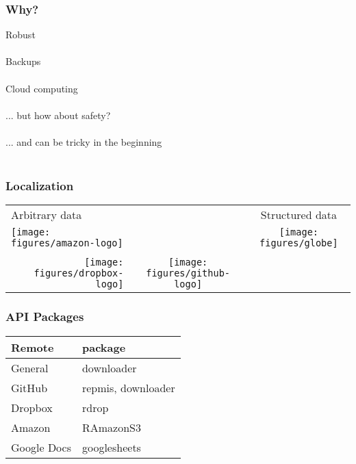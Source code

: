 \documentclass{beamer}
\begin{document}
\begin{frame}
	\frametitle{Why?}
	\begin{center}
		Robust  \\~\\
		
		Backups  \\~\\
		
		Cloud computing  \\~\\
		
		... but how about safety? \\~\\
		
		... and can be tricky in the beginning \\~\\
	\end{center}
\end{frame}

\begin{frame}
	\frametitle{Localization}
	\begin{table}[t]
		\begin{center}
			\begin{tabular}{ l c c }
				Arbitrary data & & Structured data \\
				\texttt{[image: figures/amazon-logo]} & & 
				\texttt{[image: figures/globe]} \\
				& & \\
				\multicolumn{1}{r}{\texttt{[image: figures/dropbox-logo]}}
				 & 
				\texttt{[image: figures/github-logo]} &  \\
			\end{tabular}
		\end{center}
	\end{table}
\end{frame}

\begin{frame}
	\frametitle{API Packages}
	\begin{table}[t]
		\begin{center}
			\begin{tabular}{ l l }
				\textbf{Remote} & 
				\textbf{package} \\
				\hline
				General & downloader \\
				GitHub & repmis, downloader \\
				Dropbox & rdrop \\
				Amazon & RAmazonS3 \\
				Google Docs & googlesheets \\
			\end{tabular}
		\end{center}
	\end{table}
\end{frame}
\end{document}
